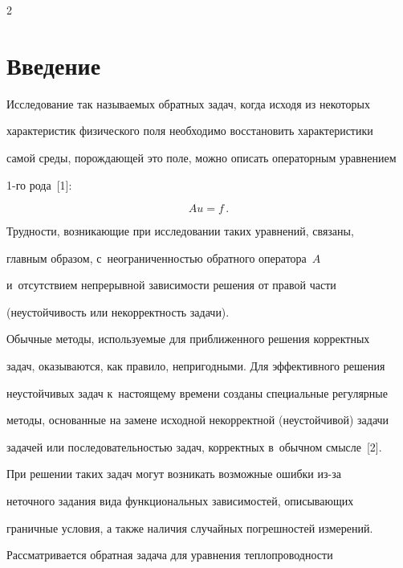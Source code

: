 \begin{multicols}{2}



\label{st\stat}

  

\section{Введение}



  Исследование так называемых обратных задач, когда исходя из некоторых 

характеристик физического поля необходимо восстановить характеристики 

самой среды, порождающей это поле, можно описать операторным уравнением 

1-го рода~[1]:

  $$

  Au=f\,.

  $$

  

  Трудности, возникающие при исследовании \mbox{таких} уравнений, связаны, 

главным образом, с~неограниченностью обратного оператора~$A$ 

и~отсутствием непрерывной зависимости решения от \mbox{правой} части 

(неустойчивость или некорректность задачи). 

  

  Обычные методы, используемые для приближенного решения корректных 

задач, оказываются, как правило, непригодными. Для эффективного решения 

неустойчивых задач к~настоящему времени созданы специальные регулярные 

методы, основанные на замене исходной некорректной (неустойчивой) задачи 

задачей или последовательностью задач, корректных в~обычном смысле~[2].

  

  При решении таких задач могут возникать возможные ошибки из-за 

неточного задания вида функциональных зависимостей, описывающих 

граничные условия, а также наличия случайных погрешностей измерений.

  

  Рассматривается обратная задача для уравнения теплопроводности 


\end{multicols}
